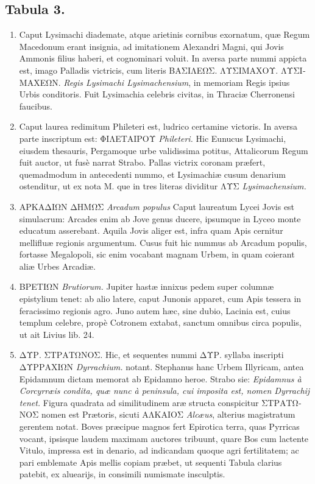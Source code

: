 \documentclass[a4paper, 11pt, oneside, polutonikogreek, latin]{article}
\begin{document}
\subsection*{Tabula 3.}
\begin{enumerate}
    \item Caput Lysimachi diademate, atque arietinis cornibus exornatum, quæ Regum Macedonum erant insignia, ad imitationem Alexandri Magni, qui Jovis Ammonis filius haberi, et cognominari voluit. In aversa parte nummi appicta est, imago Palladis victricis, cum literis \foreignlanguage{greek}{ΒΑΣΙΛΕΩΣ. ΛΥΣΙΜΑΧΟΥ. ΛΥΣΙΜΑΧΕΩΝ.} \emph{Regis Lysimachi Lysimachensium}, in memoriam Regis ipsius Urbis conditoris. Fuit Lysimachia celebris civitas, in Thraciæ Cherronensi faucibus.

    \item Caput laurea redimitum Phileteri est, ludrico certamine victoris. In aversa parte inscriptum est: \foreignlanguage{greek}{ΦΙΛΕΤΑΙΡΟΥ} \emph{Phileteri.} Hic Eunucus Lysimachi, eiusdem thesauris, Pergamoque urbe validissima potitus, Attalicorum Regum fuit auctor, ut fusè narrat Strabo. Pallas victrix coronam præfert, quemadmodum in antecedenti nummo, et Lysimachiæ cusum denarium ostenditur, ut ex nota M. que in tres literas dividitur \foreignlanguage{greek}{ΛΥΣ} \emph{Lysimachensium.}

    \item \foreignlanguage{greek}{ΑΡΚΑΔΙΩΝ ΔΗΜΩΣ} \emph{Arcadum populus} Caput laureatum Lycei Jovis est simulacrum: Arcades enim ab Jove genus ducere, ipsumque in Lyceo monte educatum asserebant. Aquila Jovis aliger est, infra quam Apis cernitur mellifluæ regionis argumentum. Cusus fuit hic nummus ab Arcadum populis, fortasse Megalopoli, sic enim vocabant magnam Urbem, in quam coierant aliæ Urbes Arcadiæ.

    \item \foreignlanguage{greek}{ΒΡΕΤΙΩΝ} \emph{Brutiorum.} Jupiter hastæ innixus pedem super columnæ epistylium tenet: ab alio latere, caput Junonis apparet, cum Apis tessera in feracissimo regionis agro. Juno autem hæc, sine dubio, Lacinia est, cuius templum celebre, propè Cotronem extabat, sanctum omnibus circa populis, ut ait Livius lib. 24.

    \item \foreignlanguage{greek}{ΔΥΡ. ΣΤΡΑΤΩΝΟΣ}. Hic, et sequentes nummi \foreignlanguage{greek}{ΔΥΡ}. syllaba inscripti\\ \foreignlanguage{greek}{ΔΥΡΡΑΧΙΩΝ} \emph{Dyrrachium.} notant. Stephanus hanc Urbem Illyricam, antea Epidamnum dictam memorat ab Epidamno heroe. Strabo sie: \emph{Epidamnus à Corcyrræis condita, quæ nunc à peninsula, cui imposita est, nomen Dyrrachij tenet.} Figura quadrata ad similitudinem aræ structa conspicitur \foreignlanguage{greek}{ΣΤΡΑΤΩΝΟΣ} nomen est Prætoris, sicuti \foreignlanguage{greek}{ΑΛΚΑΙΟΣ} \emph{Alcæus}, alterius magistratum gerentem notat. Boves præcipue magnos fert Epirotica terra, quas Pyrricas vocant, ipsisque laudem maximam auctores tribuunt, quare Bos cum lactente Vitulo, impressa est in denario, ad indicandam quoque agri fertilitatem; ac pari emblemate Apis mellis copiam præbet, ut sequenti Tabula clarius patebit, ex aluearijs, in consimili numismate insculptis.


\end{enumerate}
\end{document}
